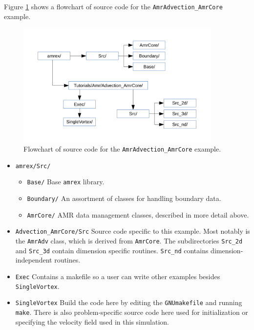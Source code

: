 Figure \ref{fig:AmrAdvection_AmrCore_flowchart} shows a flowchart
of source code for the {\tt AmrAdvection\_AmrCore} example.
\begin{figure}[htb]
\begin{center}
\includegraphics[width=4in]{./AmrCore/figs/flowchart.pdf}
\caption{\label{fig:AmrAdvection_AmrCore_flowchart} Flowchart of source code for the 
         {\tt AmrAdvection\_AmrCore} example.}
\end{center}
\end{figure}
\begin{itemize}
\item {\tt amrex/Src/}
\begin{itemize}
\item {\tt Base/} Base {\tt amrex} library.
\item {\tt Boundary/} An assortment of classes for handling boundary data.
\item {\tt AmrCore/} AMR data management classes, described in more detail above.
\end{itemize}
\item {\tt Advection\_AmrCore/Src} Source code specific to this example.  Most notably
is the {\tt AmrAdv} class, which is derived from {\tt AmrCore}.  The subdirectories {\tt Src\_2d}
and {\tt Src\_3d} contain dimension specific routines.  {\tt Src\_nd} contains dimension-independent routines.
\item {\tt Exec} Contains a makefile so a user can write other examples besides {\tt SingleVortex}.
\item {\tt SingleVortex} Build the code here by editing the {\tt GNUmakefile} and running {\tt make}.  There
is also problem-specific source code here used for initialization or specifying the velocity field used in this
simulation.
\end{itemize}

